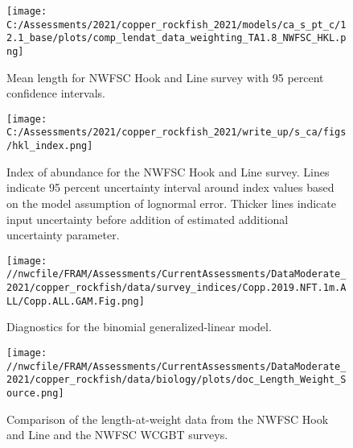 \documentclass[11pt,
  english,
  a4paper,
]{article}
\begin{document}
\begin{figure}
\centering
\texttt{[image: C:/Assessments/2021/copper\_rockfish\_2021/models/ca\_s\_pt\_c/12.1\_base/plots/comp\_lendat\_data\_weighting\_TA1.8\_NWFSC\_HKL.png]}
\caption{Mean length for NWFSC Hook and Line survey with 95 percent confidence intervals.\label{fig:mean-hkl-len-data}}
\end{figure}

\tagmcend\tagstructend


\begin{figure}
\centering
\texttt{[image: C:/Assessments/2021/copper\_rockfish\_2021/write\_up/s\_ca/figs/hkl\_index.png]}
\caption{Index of abundance for the NWFSC Hook and Line survey. Lines indicate 95 percent uncertainty interval around index values based on the model assumption of lognormal error. Thicker lines indicate input uncertainty before addition of estimated additional uncertainty parameter.\label{fig:hkl-index}}
\end{figure}

\tagmcend\tagstructend


\begin{figure}
\centering
\texttt{[image: //nwcfile/FRAM/Assessments/CurrentAssessments/DataModerate\_2021/copper\_rockfish/data/survey\_indices/Copp.2019.NFT.1m.ALL/Copp.ALL.GAM.Fig.png]}
\caption{Diagnostics for the binomial generalized-linear model.\label{fig:hkl-diag}}
\end{figure}

\tagmcend\tagstructend


\begin{figure}
\centering
\texttt{[image: //nwcfile/FRAM/Assessments/CurrentAssessments/DataModerate\_2021/copper\_rockfish/data/biology/plots/doc\_Length\_Weight\_Source.png]}
\caption{Comparison of the length-at-weight data from the NWFSC Hook and Line and the NWFSC WCGBT surveys.\label{fig:len-weight-survey}}
\end{figure}

\tagmcend\tagstructend

\end{document}
